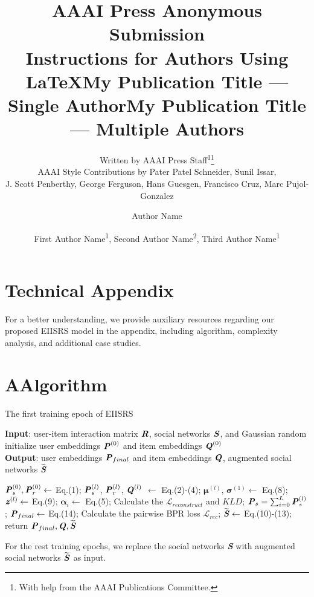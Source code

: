 \documentclass[letterpaper]{article} %
\title{AAAI Press Anonymous Submission\\Instructions for Authors Using \LaTeX{}}
\author{
    Written by AAAI Press Staff\textsuperscript{\rm 1}\thanks{With help from the AAAI Publications Committee.}\\
    AAAI Style Contributions by Pater Patel Schneider,
    Sunil Issar,\\
    J. Scott Penberthy,
    George Ferguson,
    Hans Guesgen,
    Francisco Cruz\equalcontrib,
    Marc Pujol-Gonzalez\equalcontrib
}
\title{My Publication Title --- Single Author}
\author {
    Author Name
}
\title{My Publication Title --- Multiple Authors}
\author {
    First Author Name\textsuperscript{\rm 1},
    Second Author Name\textsuperscript{\rm 2},
    Third Author Name\textsuperscript{\rm 1}
}
\begin{document}
\section{Technical Appendix}
For a better understanding, we provide auxiliary resources regarding our proposed EIISRS model in the appendix, including algorithm, complexity analysis, and additional case studies.
\section{A{\quad}Algorithm}
\begin{algorithm}[h]
    \caption{The first training epoch of EIISRS}
    \label{alg:algorithm}
    \textbf{Input}: user-item interaction matrix $\textbf{\textit{R}}$, social networks $\textbf{\textit{S}}$, and Gaussian random initialize user embeddings $\textbf{\textit{P}}^{(0)}$ and item embeddings $\textbf{\textit{Q}}^{(0)}$\\
    \textbf{Output}: user embeddings $\textbf{\textit{P}}_{final}$ and item embeddings $\textbf{\textit{Q}}$, augmented social networks $\widetilde{\textbf{\textit{S}}}$
    \begin{algorithmic}[1]
                \State $\textbf{\textit{P}}^{(0)}_s, \textbf{\textit{P}}^{(0)}_r \gets$ Eq.(1); \textcolor{RoyalBlue}{}
                    \State $\textbf{\textit{P}}^{(l)}_s$, $\textbf{\textit{P}}^{(l)}_r$, $\textbf{\textit{Q}}^{(l)}$ $\gets$ Eq.(2)-(4);\textcolor{RoyalBlue}{}
                    \State $\boldsymbol{\mu}^{(l)}$, $\boldsymbol{\sigma}^{(1)} \gets$ Eq.(8);
                    \State $\textbf{\textit{z}}^{(l)} \gets$ Eq.(9); \textcolor{RoyalBlue}{}
                    \State $\boldsymbol{\alpha}_i \gets$ Eq.(5);
                    \State Calculate the $\mathcal{L}_{reconstruct}$ and $KLD$;
                \EndFor
                \State $\textbf{\textit{P}}_s = \sum_{i=0}^{L}\textbf{\textit{P}}_s^{(l)}$; \textcolor{RoyalBlue}{}
                \State $\textbf{\textit{P}}_{final} \gets$ Eq.(14);
                \State Calculate the pairwise BPR loss $\mathcal{L}_{rec}$;
            \EndFor
            \State $\widetilde{\textbf{\textit{S}}} \gets$ Eq.(10)-(13); \textcolor{RoyalBlue}{}
        \EndFor
        \State return $\textbf{\textit{P}}_{final}, \textbf{\textit{Q}}, \widetilde{\textbf{\textit{S}}}$
    \end{algorithmic}
\end{algorithm}
For the rest training epochs, we replace the social networks \textbf{\textit{S}} with augmented social networks $\widetilde{\textbf{\textit{S}}}$ as input.
\end{document}
